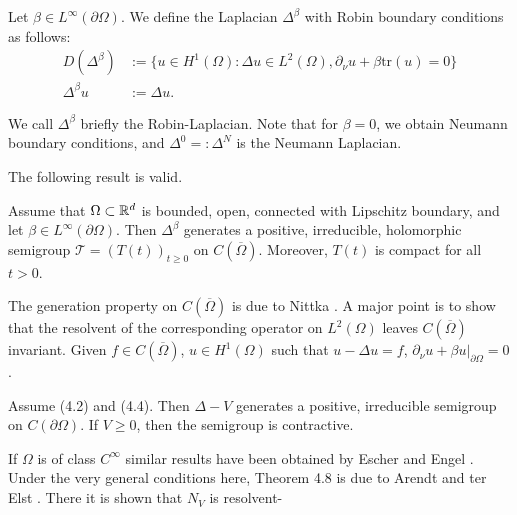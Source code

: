 Let $\beta \in L^\infty(\partial\Omega)$. We define the Laplacian $\Delta^\beta$ with Robin boundary conditions as follows:
\begin{align}
D(\Delta^\beta) &:= \{u \in H^1(\Omega) : \Delta u \in L^2(\Omega), \partial_\nu u + \beta \text{tr}(u) = 0\} \\
\Delta^\beta u &:= \Delta u.
\end{align}

We call $\Delta^\beta$ briefly the Robin-Laplacian. Note that for $\beta = 0$, we obtain Neumann boundary conditions, and $\Delta^0 =: \Delta^N$ is the Neumann Laplacian.

The following result is valid.

\begin{theorem}[4.3]
Assume that $\Omega \subset \mathbb{R}^d$ is bounded, open, connected with Lipschitz boundary, and let $\beta \in L^\infty(\partial\Omega)$. Then $\Delta^\beta$ generates a positive, irreducible, holomorphic semigroup $\mathcal{T} = (T(t))_{t \geq 0}$ on $C(\overline{\Omega})$. Moreover, $T(t)$ is compact for all $t > 0$.
\end{theorem}

The generation property on $C(\overline{\Omega})$ is due to Nittka \cite{Ni11}. A major point is to show that the resolvent of the corresponding operator on $L^2(\Omega)$ leaves $C(\overline{\Omega})$ invariant. Given $f \in C(\overline{\Omega})$, $u \in H^1(\Omega)$ such that $u - \Delta u = f$, $\partial_\nu u + \beta u|_{\partial\Omega} = 0$.

\begin{theorem}[4.8]
Assume (4.2) and (4.4). Then $\Delta - V$ generates a positive, irreducible semigroup on $C(\partial\Omega)$. If $V \geq 0$, then the semigroup is contractive.
\end{theorem}

If $\Omega$ is of class $C^\infty$ similar results have been obtained by Escher \cite{Es94} and Engel \cite{En03}. Under the very general conditions here, Theorem 4.8 is due to Arendt and ter Elst \cite{AtE20}. There it is shown that $N_V$ is resolvent-